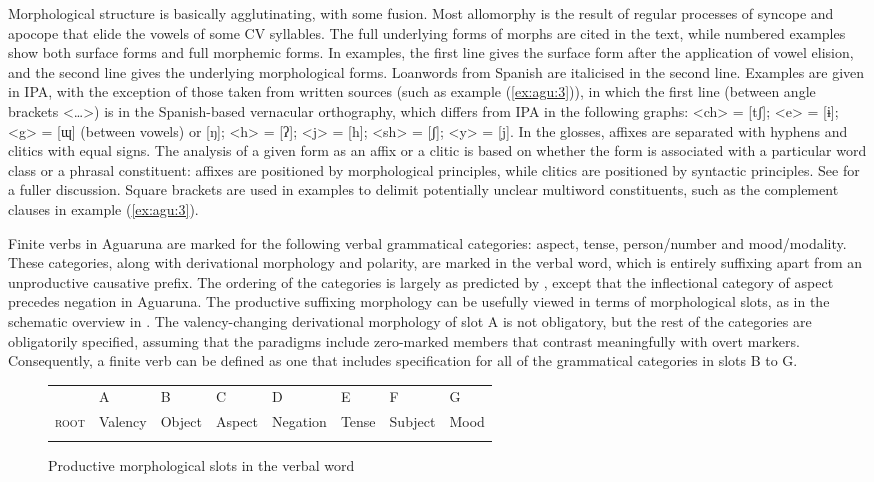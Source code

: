 \documentclass[output=paper,colorlinks,citecolor=brown,draft]{langscibook}
\begin{document}
Morphological structure is basically agglutinating, with some fusion. Most allomorphy is the result of regular processes of syncope and apocope that elide the vowels of some CV syllables. The full underlying forms of morphs are cited in the text, while numbered examples show both surface forms and full morphemic forms. 
In examples, the first line gives the surface form after the application of vowel elision, and the second line gives the underlying morphological forms. Loanwords from Spanish are italicised in the second line. Examples are given in IPA, with the exception of those taken from written sources (such as example (\ref{ex:agu:3})), in which the first line (between angle brackets <…>) is in the Spanish-based vernacular orthography, which differs from IPA in the following graphs: <ch> = [tʃ]; <e> = [ɨ]; <g> = [ɰ] (between vowels) or [ŋ]; <h> = [ʔ]; <j> = [h]; <sh> = [ʃ]; <y> = [j]. In  the glosses, affixes are separated with hyphens and clitics with equal signs. The analysis of a given form as an affix or a clitic is based on whether the form is associated with a particular word class or a phrasal constituent: affixes are positioned by morphological principles, while clitics are positioned by syntactic principles. See \citet[9--10]{Overall2017a} for a fuller discussion. Square brackets are used in examples to delimit potentially unclear multiword constituents, such as the complement clauses in example (\ref{ex:agu:3}). 

Finite verbs in Aguaruna are marked for the following verbal grammatical categories: aspect, tense, person/number and mood/modality. These categories, along with derivational morphology and polarity, are marked in the verbal word, which is entirely suffixing apart from an unproductive causative prefix. The ordering of the categories is largely as predicted by \citet{Bybee1985}, except that the inflectional category of aspect precedes negation in Aguaruna. The productive suffixing morphology can be usefully viewed in terms of morphological slots, as in the schematic overview in . The valency-changing derivational morphology of slot A is not obligatory, but the rest of the categories are obligatorily specified, assuming that the paradigms include zero-marked members that contrast meaningfully with overt markers. Consequently, a finite verb can be defined as one that includes specification for all of the grammatical categories in slots B to G.

\begin{figure}
\begin{tabular}{llllllll}
\lsptoprule
& {A} & {B} & {C} & {D} & {E} & {F} & {G}\\
{\scshape root} & {Valency} & {Object} & {Aspect} & {Negation} & {Tense} & {Subject} & {Mood}\\
\lspbottomrule
\end{tabular}
\caption{Productive morphological slots in the verbal word}
\label{fig:agu:1}
\end{figure}
\end{document}
